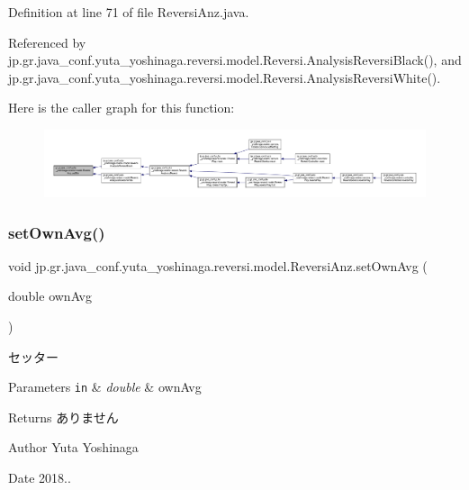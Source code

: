 Definition at line 71 of file Reversi\+Anz.\+java.



Referenced by jp.\+gr.\+java\+\_\+conf.\+yuta\+\_\+yoshinaga.\+reversi.\+model.\+Reversi.\+Analysis\+Reversi\+Black(), and jp.\+gr.\+java\+\_\+conf.\+yuta\+\_\+yoshinaga.\+reversi.\+model.\+Reversi.\+Analysis\+Reversi\+White().

Here is the caller graph for this function\+:
\nopagebreak
\begin{figure}[H]
\begin{center}
\leavevmode
\includegraphics[width=350pt]{classjp_1_1gr_1_1java__conf_1_1yuta__yoshinaga_1_1reversi_1_1model_1_1_reversi_anz_a01e99c7c05a6cca350ea00cc3a0940bf_icgraph}
\end{center}
\end{figure}
\mbox{\label{classjp_1_1gr_1_1java__conf_1_1yuta__yoshinaga_1_1reversi_1_1model_1_1_reversi_anz_a61cdd5fd8811fdfb3b91ec0deee28e00}} 
\subsubsection{\texorpdfstring{set\+Own\+Avg()}{setOwnAvg()}}
{\footnotesize\ttfamily void jp.\+gr.\+java\+\_\+conf.\+yuta\+\_\+yoshinaga.\+reversi.\+model.\+Reversi\+Anz.\+set\+Own\+Avg (\begin{DoxyParamCaption}\item[{double}]{own\+Avg }\end{DoxyParamCaption})}



セッター 


\begin{DoxyParams}[1]{Parameters}
\mbox{\tt in}  & {\em double} & own\+Avg \\
\hline
\end{DoxyParams}
\begin{DoxyReturn}{Returns}
ありません 
\end{DoxyReturn}
\begin{DoxyAuthor}{Author}
Yuta Yoshinaga 
\end{DoxyAuthor}
\begin{DoxyDate}{Date}
2018.. 
\end{DoxyDate}


